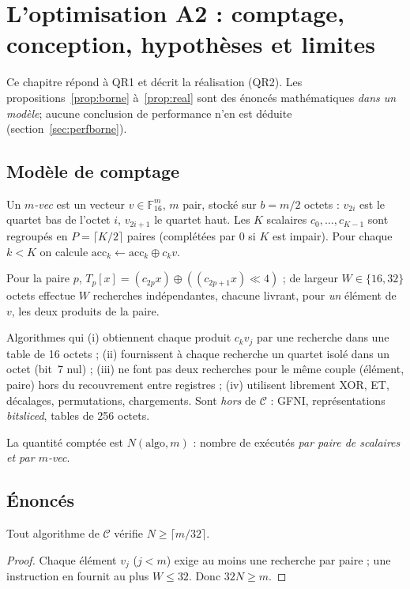 \chapter{L'optimisation A2 : comptage, conception, hypothèses et limites}
\label{ch:a2}

Ce chapitre répond à QR1 et décrit la réalisation (QR2). Les propositions~\ref{prop:borne} à~\ref{prop:real} sont des énoncés mathématiques \emph{dans un modèle}; aucune conclusion de performance n'en est déduite (section~\ref{sec:perfborne}).

\section{Modèle de comptage}
\begin{definition}[Données]
Un \emph{$m$-vec} est un vecteur $v\in\mathbb{F}_{16}^m$, $m$ pair, stocké sur $b=m/2$ octets : $v_{2i}$ est le quartet bas de l'octet $i$, $v_{2i+1}$ le quartet haut. Les $K$ scalaires $c_0,\dots,c_{K-1}$ sont regroupés en $P=\lceil K/2\rceil$ paires (complétées par 0 si $K$ est impair). Pour chaque $k<K$ on calcule $\mathrm{acc}_k\leftarrow\mathrm{acc}_k\oplus c_k v$.
\end{definition}
Pour la paire $p$, $T_p[x]=(c_{2p}x)\oplus((c_{2p+1}x)\ll4)$ ; \vpshufb{} de largeur $W\in\{16,32\}$ octets effectue $W$ recherches indépendantes, chacune livrant, pour \emph{un} élément de $v$, les deux produits de la paire.

\begin{definition}
Algorithmes qui (i) obtiennent chaque produit $c_kv_j$ par une recherche dans une table de 16 octets ; (ii) fournissent à chaque recherche un quartet isolé dans un octet (bit~7 nul) ; (iii) ne font pas deux recherches pour le même couple (élément, paire) hors du recouvrement entre registres ; (iv) utilisent librement XOR, ET, décalages, permutations, chargements. Sont \emph{hors} de $\mathcal{C}$ : GFNI, représentations \emph{bitsliced}, tables de 256 octets.
\end{definition}
La quantité comptée est $N(\text{algo},m)$ : nombre de \vpshufb{} exécutés \emph{par paire de scalaires et par $m$-vec}.

\section{Énoncés}
\begin{proposition}[Borne]\label{prop:borne}
Tout algorithme de $\mathcal{C}$ vérifie $N\ge\lceil m/32\rceil$.
\end{proposition}
\begin{proof}
Chaque élément $v_j$ ($j<m$) exige au moins une recherche par paire ; une instruction en fournit au plus $W\le32$. Donc $32N\ge m$.
\end{proof}


